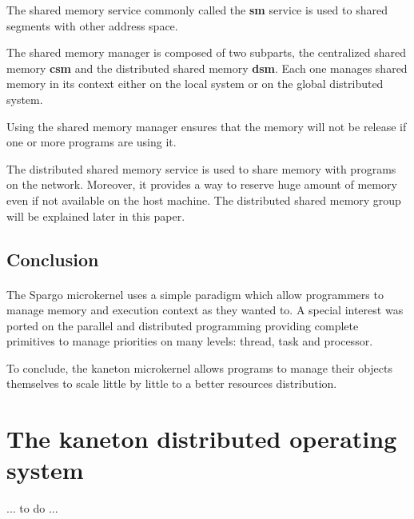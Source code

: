 \documentclass[10pt,a4wide]{article}
\begin{document}
\begin{multicols}{2}
The shared memory service commonly called the \textbf{sm} service is used
to shared segments with other address space.

The shared memory manager is composed of two subparts, the centralized
shared memory \textbf{csm} and the distributed shared memory \textbf{dsm}.
Each one manages shared memory in its context either on the local system
or on the global distributed system.

Using the shared memory manager ensures that the memory will not be release
if one or more programs are using it.

The distributed shared memory service is used to share memory with
programs on the network. Moreover, it provides a way to reserve huge amount
of memory even if not available on the host machine. The distributed shared
memory group will be explained later in this paper.

\subsection{Conclusion}

\paragraph{}

The Spargo microkernel uses a simple paradigm which allow programmers to
manage memory and execution context as they wanted to. A special interest
was ported on the parallel and distributed programming providing complete
primitives to manage priorities on many levels: thread, task and processor.

To conclude, the kaneton microkernel allows programs to manage their objects
themselves to scale little by little to a better resources distribution.



\section{The kaneton distributed operating system}

... to do ...

\end{multicols}
\end{document}
